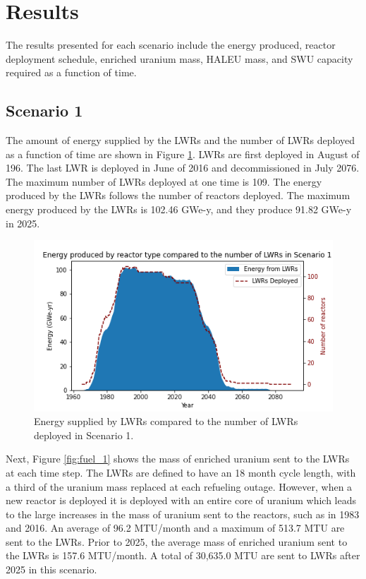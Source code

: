 \section{Results}
The results presented for each scenario include the energy produced, reactor 
deployment schedule, enriched
uranium mass, \gls{HALEU} mass, and \gls{SWU} capacity required as a function of time. 

\subsection{Scenario 1}
The amount of energy supplied by the \glspl{LWR} and the number of \glspl{LWR}
deployed as a function of time are shown in Figure \ref{fig:energy_rx_1}. 
\glspl{LWR} are first deployed in August of 196. The last 
\gls{LWR} is deployed in June of 2016 and decommissioned in July 2076. The 
maximum number of 
\glspl{LWR} deployed at one time is 109. The energy produced by the 
\glspl{LWR} follows the number of reactors deployed. The maximum energy 
produced by the \glspl{LWR} is 102.46 GWe-y, and they produce 91.82 GWe-y 
in 2025.

\begin{figure}
    \centering 
    \includegraphics[width=\textwidth]{../figures/energy_scenario1.png}
    \caption{Energy supplied by \glspl{LWR} compared to the number of 
    \glspl{LWR} deployed in Scenario 1.}
    \label{fig:energy_rx_1}
\end{figure}

Next, Figure \ref{fig:fuel_1} shows the mass of enriched uranium sent to 
the \glspl{LWR} at each time step. The \glspl{LWR} are 
defined to have an 18 month cycle length, with a third of the uranium 
mass replaced at each refueling outage. However, when a new reactor 
is deployed it is deployed with an entire core of uranium which leads 
to the large increases in the mass of uranium sent to the reactors, such 
as in 1983 and 2016. An average of 96.2 MTU/month and a maximum of 513.7 MTU 
are sent to the \glspl{LWR}. Prior to 2025, the average mass
of enriched uranium sent to the \glspl{LWR} is 157.6 MTU/month. A total 
of 30,635.0 MTU are sent to \glspl{LWR} after 2025 in this scenario. 

